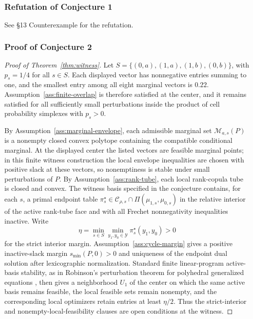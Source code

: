 \documentclass[11pt]{article}
\theoremstyle{definition}
\theoremstyle{plain}
\theoremstyle{remark}
\begin{document}
\subsubsection*{Refutation of Conjecture 1}
See \S13 Counterexample for the refutation.

\subsubsection*{Proof of Conjecture 2}
\begin{proof}[Proof of Theorem~\ref{thm:witness}]
Let \(S=\{(0,a),(1,a),(1,b),(0,b)\}\), with \(p_s=1/4\) for all \(s\in S\).  Each displayed vector has nonnegative entries summing to one, and the smallest entry among all eight marginal vectors is \(0.22\).  Assumption~\ref{ass:finite-overlap} is therefore satisfied at the center, and it remains satisfied for all sufficiently small perturbations inside the product of cell probability simplexes with \(p_s>0\).

By Assumption~\ref{ass:marginal-envelope}, each admissible marginal set \(\mathcal M_{a,s}(P)\) is a nonempty closed convex polytope containing the compatible conditional marginal.  At the displayed center the listed vectors are feasible marginal points; in this finite witness construction the local envelope inequalities are chosen with positive slack at these vectors, so nonemptiness is stable under small perturbations of \(P\).  By Assumption~\ref{ass:rank-tube}, each local rank-copula tube is closed and convex.  The witness basis specified in the conjecture contains, for each \(s\), a primal endpoint table \(\pi_s^\star\in\mathcal C_{\rho,s}\cap\Pi(\mu_{1,s},\mu_{0,s})\) in the relative interior of the active rank-tube face and with all Frechet nonnegativity inequalities inactive.  Write
\[
\eta=\min_{s\in S}\min_{y_1,y_0\in\mathcal Y}\pi_s^\star(y_1,y_0)>0
\]
for the strict interior margin.  Assumption~\ref{ass:cycle-margin} gives a positive inactive-slack margin \(s_{\min}(P,0)>0\) and uniqueness of the endpoint dual solution after lexicographic normalization.  Standard finite linear-program active-basis stability, as in Robinson's perturbation theorem for polyhedral generalized equations \cite{Robinson1981}, then gives a neighborhood \(U_1\) of the center on which the same active basis remains feasible, the local feasible sets remain nonempty, and the corresponding local optimizers retain entries at least \(\eta/2\).  Thus the strict-interior and nonempty-local-feasibility clauses are open conditions at the witness.


\end{proof}
\end{document}
